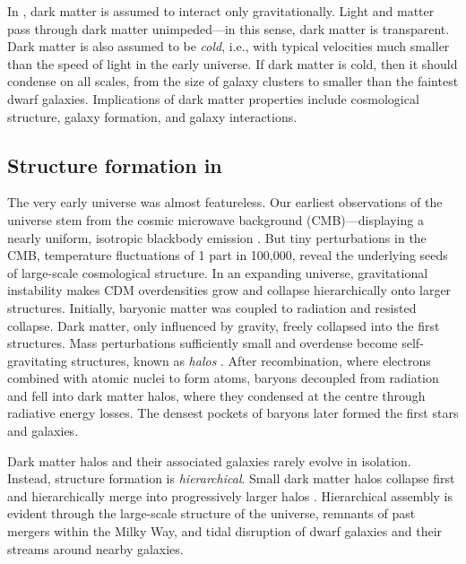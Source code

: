 In \LCDM{}, dark matter is assumed to interact only gravitationally.
Light and matter pass through dark matter unimpeded---in this sense,
dark matter is transparent. Dark matter is also assumed to be
\emph{cold}, i.e., with typical velocities much smaller than the speed
of light in the early universe. If dark matter is cold, then it should
condense on all scales, from the size of galaxy clusters to smaller than
the faintest dwarf galaxies. Implications of dark matter properties
include cosmological structure, galaxy formation, and galaxy
interactions.

\subsection{\texorpdfstring{Structure formation in
\LCDM{}}{Structure formation in }}\label{structure-formation-in}

The very early universe was almost featureless. Our earliest
observations of the universe stem from the cosmic microwave background
(CMB)---displaying a nearly uniform, isotropic blackbody emission
\citep[e.g.,][]{ryden2016}. But tiny perturbations in the CMB,
temperature fluctuations of 1 part in 100,000, reveal the underlying
seeds of large-scale cosmological structure. In an expanding universe,
gravitational instability makes CDM overdensities grow and collapse
hierarchically onto larger structures. Initially, baryonic matter was
coupled to radiation and resisted collapse. Dark matter, only influenced
by gravity, freely collapsed into the first structures. Mass
perturbations sufficiently small and overdense become self-gravitating
structures, known as \emph{halos} \citep[e.g.,][]{galaxiesbook}. After
recombination, where electrons combined with atomic nuclei to form
atoms, baryons decoupled from radiation and fell into dark matter halos,
where they condensed at the centre through radiative energy losses. The
densest pockets of baryons later formed the first stars and galaxies.

Dark matter halos and their associated galaxies rarely evolve in
isolation. Instead, \LCDM{} structure formation is \emph{hierarchical}.
Small dark matter halos collapse first and hierarchically merge into
progressively larger halos
\citep[e.g.,][]{white+rees1978, blumenthal+1984, white+frenk1991}.
Hierarchical assembly is evident through the large-scale structure of
the universe, remnants of past mergers within the Milky Way, and tidal
disruption of dwarf galaxies and their streams around nearby galaxies.

